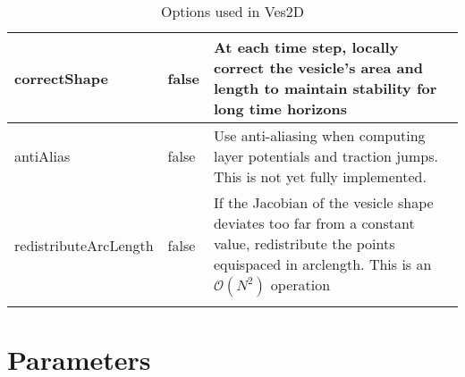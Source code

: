 \documentclass[12pt]{article}
\begin{document}
\begin{longtable}{|l|l|m{6cm}|}
correctShape & false & 
At each time step, locally correct the vesicle's area and length to
maintain stability for long time horizons \\ \hline
antiAlias & false & 
Use anti-aliasing when computing layer potentials and traction jumps.
This is not yet fully implemented.
\\ \hline
redistributeArcLength & false & 
If the Jacobian of the vesicle shape deviates too far from a constant
value, redistribute the points equispaced in arclength.  This is an
$\mathcal{O}(N^{2})$ operation \\ \hline
\caption{Options used in Ves2D}
\end{longtable}



\section{Parameters}
\end{document}
